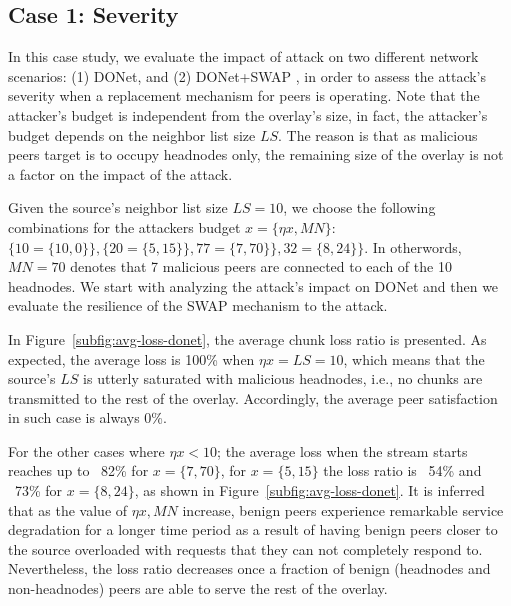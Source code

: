 \subsection{Case 1: \drop Severity}

In this case study, we evaluate the impact of \drop attack on two different network scenarios:  (1) DONet, and (2) DONet+SWAP \cite{nguyen2016swap}, in order to assess the attack's severity when a replacement mechanism for peers is operating.
Note that the attacker's budget is independent from the overlay's size, in fact, the attacker's budget depends on the neighbor list size $LS$.
The reason is that as malicious peers target is to occupy headnodes only, the remaining size of the overlay is not a factor on the impact of the \drop attack.

Given the source's neighbor list size $LS=10$, we choose the following combinations for the attackers budget $x={\{\eta x, MN\}}$: $\{10=\{10,0\}\}, \{20=\{5,15\}\}, 77=\{7,70\}\}, 32=\{8,24\}\}$.
In otherwords, $MN=70$ denotes that 7 malicious peers are connected to each of the 10 headnodes.
We start with analyzing the attack's impact on DONet and then we evaluate the resilience of the SWAP mechanism to the attack.

In Figure~\ref{subfig:avg-loss-donet}, the average chunk loss ratio is presented. 
As expected, the average loss is 100\% when $\eta x= LS =10$, which means that the source's $LS$ is utterly saturated with malicious headnodes, i.e., no chunks are transmitted to the rest of the overlay.
Accordingly, the average peer satisfaction in such case is always 0\%. 

For the other cases where $\eta x < 10$; the average loss when the stream starts reaches up to ~82\% for $x=\{7, 70\}$, for $x=\{5, 15\}$ the loss ratio is ~54\% and ~73\% for $x=\{8, 24\}$, as shown in Figure~\ref{subfig:avg-loss-donet}.
It is inferred that as the value of $\eta x, MN$ increase, benign peers experience remarkable service degradation for a longer time period as a result of having benign peers closer to the source overloaded with requests that they can not completely respond to. 
Nevertheless, the loss ratio decreases once a fraction of benign (headnodes and non-headnodes) peers are able to serve the rest of the overlay.

